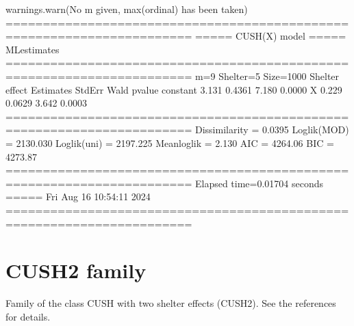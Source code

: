\documentclass[letterpaper,10pt,english]{sphinxmanual}
\begin{document}
\begin{sphinxVerbatim}[commandchars=\\\{\}]
warnings.warn(\PYGZdq{}No m given, max(ordinal) has been taken\PYGZdq{})
=======================================================================
=====\PYGZgt{}\PYGZgt{}\PYGZgt{} CUSH(X) model \PYGZlt{}\PYGZlt{}\PYGZlt{}===== ML\PYGZhy{}estimates
=======================================================================
m=9  Shelter=5  Size=1000
\PYGZhy{}\PYGZhy{}\PYGZhy{}\PYGZhy{}\PYGZhy{}\PYGZhy{}\PYGZhy{}\PYGZhy{}\PYGZhy{}\PYGZhy{}\PYGZhy{}\PYGZhy{}\PYGZhy{}\PYGZhy{}\PYGZhy{}\PYGZhy{}\PYGZhy{}\PYGZhy{}\PYGZhy{}\PYGZhy{}\PYGZhy{}\PYGZhy{}\PYGZhy{}\PYGZhy{}\PYGZhy{}\PYGZhy{}\PYGZhy{}\PYGZhy{}\PYGZhy{}\PYGZhy{}\PYGZhy{}\PYGZhy{}\PYGZhy{}\PYGZhy{}\PYGZhy{}\PYGZhy{}\PYGZhy{}\PYGZhy{}\PYGZhy{}\PYGZhy{}\PYGZhy{}\PYGZhy{}\PYGZhy{}\PYGZhy{}\PYGZhy{}\PYGZhy{}\PYGZhy{}\PYGZhy{}\PYGZhy{}\PYGZhy{}\PYGZhy{}\PYGZhy{}\PYGZhy{}\PYGZhy{}\PYGZhy{}\PYGZhy{}\PYGZhy{}\PYGZhy{}\PYGZhy{}\PYGZhy{}\PYGZhy{}\PYGZhy{}\PYGZhy{}\PYGZhy{}\PYGZhy{}\PYGZhy{}\PYGZhy{}\PYGZhy{}\PYGZhy{}\PYGZhy{}\PYGZhy{}
Shelter effect
          Estimates  StdErr    Wald  p\PYGZhy{}value
constant     \PYGZhy{}3.131  0.4361  \PYGZhy{}7.180   0.0000
X             0.229  0.0629   3.642   0.0003
=======================================================================
Dissimilarity = 0.0395
Loglik(MOD)   = \PYGZhy{}2130.030
Loglik(uni)   = \PYGZhy{}2197.225
Mean\PYGZhy{}loglik   = \PYGZhy{}2.130
\PYGZhy{}\PYGZhy{}\PYGZhy{}\PYGZhy{}\PYGZhy{}\PYGZhy{}\PYGZhy{}\PYGZhy{}\PYGZhy{}\PYGZhy{}\PYGZhy{}\PYGZhy{}\PYGZhy{}\PYGZhy{}\PYGZhy{}\PYGZhy{}\PYGZhy{}\PYGZhy{}\PYGZhy{}\PYGZhy{}\PYGZhy{}\PYGZhy{}\PYGZhy{}\PYGZhy{}\PYGZhy{}\PYGZhy{}\PYGZhy{}\PYGZhy{}\PYGZhy{}\PYGZhy{}\PYGZhy{}\PYGZhy{}\PYGZhy{}\PYGZhy{}\PYGZhy{}\PYGZhy{}\PYGZhy{}\PYGZhy{}\PYGZhy{}\PYGZhy{}\PYGZhy{}\PYGZhy{}\PYGZhy{}\PYGZhy{}\PYGZhy{}\PYGZhy{}\PYGZhy{}\PYGZhy{}\PYGZhy{}\PYGZhy{}\PYGZhy{}\PYGZhy{}\PYGZhy{}\PYGZhy{}\PYGZhy{}\PYGZhy{}\PYGZhy{}\PYGZhy{}\PYGZhy{}\PYGZhy{}\PYGZhy{}\PYGZhy{}\PYGZhy{}\PYGZhy{}\PYGZhy{}\PYGZhy{}\PYGZhy{}\PYGZhy{}\PYGZhy{}\PYGZhy{}\PYGZhy{}
AIC = 4264.06
BIC = 4273.87
=======================================================================
Elapsed time=0.01704 seconds =====\PYGZgt{}\PYGZgt{}\PYGZgt{} Fri Aug 16 10:54:11 2024
=======================================================================
\end{sphinxVerbatim}

\noindent{}


\section{CUSH2 family}
\label{\detokenize{manual:cush2-family}}
\sphinxAtStartPar
Family of the class CUSH with two shelter effects (CUSH2).
See the references for details.
\end{document}
